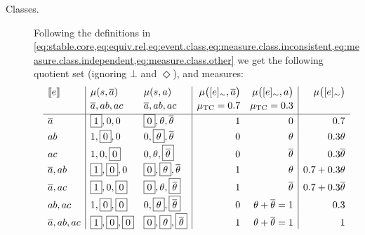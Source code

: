 \documentclass[a4paper, 10pt]{article}
\newcommand{\at}[1]{\ensuremath{\!\del{#1}}}
\newcommand{\co}[1]{\ensuremath{\overline{#1}}}
\newcommand{\stablecore}[1]{\ensuremath{\left\llbracket #1 \right\rrbracket}}
\newcommand{\pw}[1]{\ensuremath{\mu\at{#1}}}
\newcommand{\pwcfname}{\ensuremath{\mu_{\textrm{TC}}}}
\newcommand{\class}[1]{\ensuremath{[{#1}]_{\sim}}}
\newcommand{\inconsistent}{\bot}
\newcommand{\indepclass}{\ensuremath{\Diamond}}
\begin{document}
\begin{description}
    \item[Classes.] Following the definitions in \cref{eq:stable.core,eq:equiv.rel,eq:event.class,eq:measure.class.inconsistent,eq:measure.class.independent,eq:measure.class.other} we get the following quotient set (ignoring $\inconsistent$ and $\indepclass$), and measures:
          \begin{equation*}
              \begin{array}{l|ll|rr|r}
                  \stablecore{e}
                   & \pw{s, \co{a}}
                   & \pw{s, a}
                   & \pw{\class{e}, \co{a}}
                   & \pw{\class{e}, a}
                   & \pw{\class{e}}
                  \\[2pt]
                   & \co{a}, ab, ac
                   & \co{a}, ab, ac
                   & \pwcfname=0.7
                   & \pwcfname=0.3
                   &
                  \\[2pt]
                  \hline
                  \co{a}
                   & \boxed{1},0,0
                   & \boxed{0},\theta, \co{\theta}
                   & 1
                   & 0
                   & 0.7
                  \\[2pt]
                  ab
                   & 1,\boxed{0},0
                   & 0,\boxed{\theta}, \co{\theta}
                   & 0
                   & \theta
                   & 0.3\theta
                  \\[2pt]
                  ac
                   & 1,0,\boxed{0}
                   & 0,\theta, \boxed{\co{\theta}}
                   & 0
                   & \co{\theta}
                   & 0.3\co{\theta}
                  \\[2pt]
                  \co{a}, ab
                   & \boxed{1},\boxed{0},0
                   & \boxed{0},\boxed{\theta}, \co{\theta}
                   & 1
                   & \theta
                   & 0.7 + 0.3\theta
                  \\[2pt]
                  \co{a}, ac
                   & \boxed{1},0,\boxed{0}
                   & \boxed{0},\theta, \boxed{\co{\theta}}
                   & 1
                   & \co{\theta}
                   & 0.7 + 0.3\co{\theta}
                  \\[2pt]
                  ab, ac
                   & 1,\boxed{0},\boxed{0}
                   & 0,\boxed{\theta}, \boxed{\co{\theta}}
                   & 0
                   & \theta + \co{\theta} = 1
                   & 0.3
                  \\[2pt]
                  \co{a}, ab, ac
                   & \boxed{1},\boxed{0},\boxed{0}
                   & \boxed{0},\boxed{\theta}, \boxed{\co{\theta}}
                   & 1
                   & \theta + \co{\theta} = 1
                   & 1
              \end{array}
          \end{equation*}


\end{description}
\end{document}

